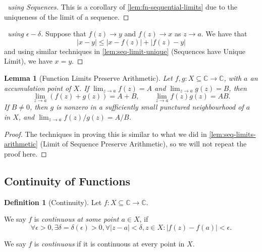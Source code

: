 \documentclass[11pt]{article}
\numberwithin{equation}{section}
\newtheorem{lemma}[theorem]{Lemma}
\theoremstyle{definition}
\newtheorem{definition}[theorem]{Definition}
\theoremstyle{remark}
\newcommand{\pqty}[1]{\left(#1\right)}
\newcommand{\abs}[1]{\left|#1\right|}
\newcommand{\functiondomain}[3]{#1:#2\to #3}
\newcommand{\CC}{\mathbb C}
\begin{document}
\begin{proof}[\proofname\ using Sequences]
    This is a corollary of \autoref{lem:fn-sequential-limits} due to the uniqueness of the limit of a sequence.
\end{proof}

\begin{proof}[\proofname\ using \(\epsilon-\delta\)]
    Suppose that \(f\pqty{z} \to y\) and \(f\pqty{z} \to x\) as \(z \to a\). We have that
    \[
        \abs{x - y} \leq \abs{x - f\pqty{z}} + \abs{f\pqty{z} - y}
    \]
    and using similar techniques in \autoref{lem:seq-limit-unique} (Sequences have Unique Limit), we have \(x = y\).
\end{proof}

\begin{lemma}[Function Limits Preserve Arithmetic]\label{analysis-unit-0077}
\label{lem:fn-limits-preserve-arithmetic}
Let \(f,g:X\subseteq\mathbb C\to\mathbb C\), with \(a\) an accumulation point of \(X\).
If \(\lim_{z\to a}f(z)=A\) and \(\lim_{z\to a}g(z)=B\), then
\[
\lim_{z\to a}(f(z)+g(z))=A+B,\qquad
\lim_{z\to a}f(z)g(z)=AB.
\]
If \(B\ne0\), then \(g\) is nonzero in a sufficiently small punctured neighbourhood
of \(a\) in \(X\), and \(\lim_{z\to a}f(z)/g(z)=A/B\).
\end{lemma}

\begin{proof}
    The techniques in proving this is similar to what we did in \autoref{lem:seq-limits-arithmetic} (Limit of Sequence Preserve Arithmetic), so we will not repeat the proof here.
\end{proof}

\subsection{Continuity of Functions}

\begin{definition}[Continuity]\label{analysis-unit-0078}
    \label{def:fn-continuity}%
    Let \(\functiondomain{f}{X \subseteq \CC}{\CC}\).

    We say \(f\) is \emph{continuous at some point \(a \in X\)}, if
    \[
        \forall \epsilon > 0, \exists \delta = \delta\pqty{\epsilon}>0, \forall \abs{z - a} < \delta, z \in X: \abs{f\pqty{z} - f\pqty{a}} < \epsilon.
    \]

    
    
    We say \(f\) is \emph{continuous} if it is continuous at every point in \(X\).    
\end{definition}
\end{document}
